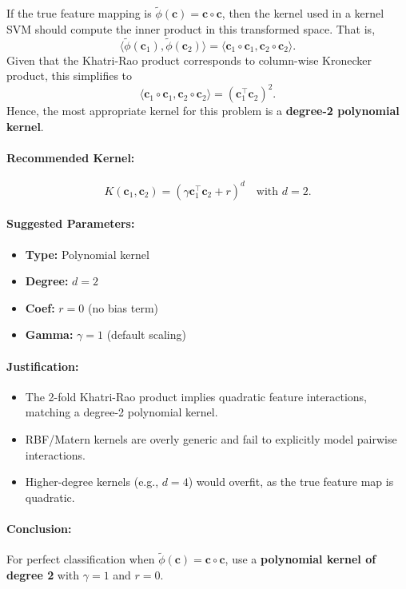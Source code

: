 \documentclass[11pt]{article}
\begin{document}
If the true feature mapping is \(\tilde{\phi}(\mathbf{c}) = \mathbf{c} \circ \mathbf{c}\), then the kernel used in a kernel SVM should compute the inner product in this transformed space. That is,
\[
\langle \tilde{\phi}(\mathbf{c}_1), \tilde{\phi}(\mathbf{c}_2) \rangle = \langle \mathbf{c}_1 \circ \mathbf{c}_1, \mathbf{c}_2 \circ \mathbf{c}_2 \rangle.
\]
Given that the Khatri-Rao product corresponds to column-wise Kronecker product, this simplifies to
\[
\langle \mathbf{c}_1 \circ \mathbf{c}_1, \mathbf{c}_2 \circ \mathbf{c}_2 \rangle = (\mathbf{c}_1^\top \mathbf{c}_2)^2.
\]
Hence, the most appropriate kernel for this problem is a \textbf{degree-2 polynomial kernel}.

\paragraph{Recommended Kernel:}
\[
K(\mathbf{c}_1, \mathbf{c}_2) = (\gamma \mathbf{c}_1^\top \mathbf{c}_2 + r)^d \quad \text{with } d = 2.
\]
\paragraph{Suggested Parameters:}
\begin{itemize}
    \item \textbf{Type:} Polynomial kernel
    \item \textbf{Degree:} $d = 2$
    \item \textbf{Coef:} $r = 0$ (no bias term)
    \item \textbf{Gamma:} $\gamma = 1$ (default scaling)
\end{itemize}

\paragraph{Justification:}
\begin{itemize}
    \item The 2-fold Khatri-Rao product implies quadratic feature interactions, matching a degree-2 polynomial kernel.
    \item RBF/Matern kernels are overly generic and fail to explicitly model pairwise interactions.
    \item Higher-degree kernels (e.g., $d=4$) would overfit, as the true feature map is quadratic.
\end{itemize}

\paragraph{Conclusion:}
For perfect classification when $\tilde{\phi}(\mathbf{c}) = \mathbf{c} \circ \mathbf{c}$, use a \textbf{polynomial kernel of degree 2} with $\gamma=1$ and $r=0$.
\end{document}
